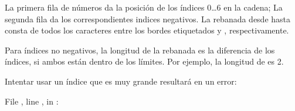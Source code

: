 \documentclass[a5paper,10pt,spanish]{sphinxmanual}
\begin{document}
\begin{sphinxVerbatim}[commandchars=\\\{\}]
             
                   
          
\end{sphinxVerbatim}

\sphinxAtStartPar
La primera fila de números da la posición de los índices 0…6 en la cadena; La segunda fila da los correspondientes indices negativos. La rebanada desde  hasta  consta de todos los caracteres entre los bordes etiquetados  y , respectivamente.

\sphinxAtStartPar
Para índices no negativos, la longitud de la rebanada es la diferencia de los índices, si ambos están dentro de los límites. Por ejemplo, la longitud de  es 2.

\sphinxAtStartPar
Intentar usar un índice que es muy grande resultará en un error:

\begin{sphinxVerbatim}[commandchars=\\\{\}]
\PYG{p}{[}\PYG{p}{]}  
  File , line , in 
: 
\end{sphinxVerbatim}
\end{document}
